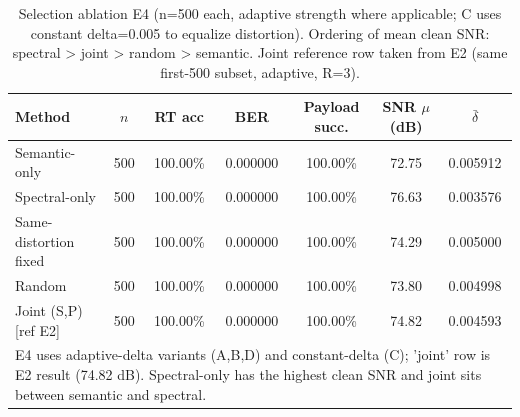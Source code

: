 \begin{table}[t]
\centering
\caption{Selection ablation E4 (n=500 each, adaptive strength where applicable; C uses constant delta=0.005 to equalize distortion). Ordering of mean clean SNR: spectral > joint > random > semantic. Joint reference row taken from E2 (same first-500 subset, adaptive, R=3).}
\label{tab:selection-e4}
\scriptsize
\begin{tabular}{lcccccc}
\toprule
\textbf{Method} & \textbf{$n$} & \textbf{RT acc} & \textbf{BER} & \textbf{Payload succ.} & \textbf{SNR $\mu$ (dB)} & \textbf{$\bar{\delta}$} \\
\midrule
Semantic-only & 500 & 100.00\% & 0.000000 & 100.00\% & 72.75 & 0.005912 \\
Spectral-only & 500 & 100.00\% & 0.000000 & 100.00\% & 76.63 & 0.003576 \\
Same-distortion fixed & 500 & 100.00\% & 0.000000 & 100.00\% & 74.29 & 0.005000 \\
Random & 500 & 100.00\% & 0.000000 & 100.00\% & 73.80 & 0.004998 \\
Joint (S,P) [ref E2] & 500 & 100.00\% & 0.000000 & 100.00\% & 74.82 & 0.004593 \\
\bottomrule
\multicolumn{7}{l}{\footnotesize E4 uses adaptive-delta variants (A,B,D) and constant-delta (C); 'joint' row is E2 result (74.82 dB). Spectral-only has the highest clean SNR and joint sits between semantic and spectral.}\\
\end{tabular}
\end{table}
